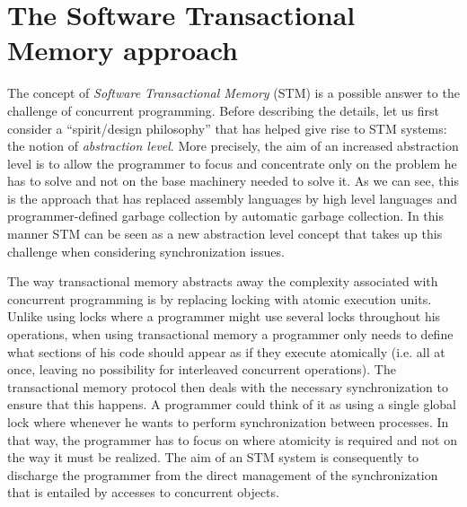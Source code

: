 

\section{The Software Transactional Memory approach}
The concept of {\it Software Transactional  Memory}   (STM)  is  a possible answer  
to   the  challenge of concurrent programming.
Before describing the details, let us first consider a ``spirit/design philosophy'' that has helped give
rise to  STM systems: the notion of 
{\it abstraction level}.
More precisely,  the  aim of an increased abstraction level is   to allow  the programmer  to  focus and
concentrate only  on the problem  he has to
solve and not on the base machinery needed to solve it. 
As we can see, this is the approach  that  has   replaced assembly languages  
by  high level languages and programmer-defined garbage collection 
by automatic garbage collection.
In this manner STM can  be seen as a  new abstraction level concept
that takes  up  this challenge when considering synchronization issues.

The way transactional memory abstracts away the  complexity associated with 
concurrent programming is   by  replacing locking  with  atomic
execution units.
Unlike using locks where a programmer might use several locks
throughout his operations, when using transactional memory
a programmer only needs to define what sections of his code should
appear as if they execute atomically (i.e. all at once, leaving
no possibility for interleaved concurrent operations).
The transactional memory protocol then deals with the necessary
synchronization to ensure that this happens.
A programmer could think of it as using a single global lock
where whenever he wants to perform synchronization between processes.
In  that way, the programmer has to focus on  where 
atomicity is required and  not on the  way it must be realized. The aim of
an STM system is consequently  to  discharge the programmer from the direct 
management  of  the  synchronization  that  is entailed  by   accesses   to
concurrent  objects.  

